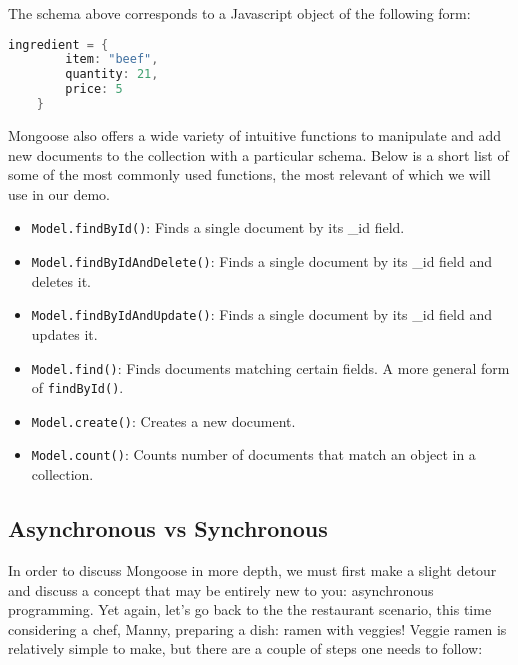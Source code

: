 The schema above corresponds to a Javascript object of the following form:

\begin{lstlisting}[language=Java]
    ingredient = {
        item: "beef",
        quantity: 21,
        price: 5
    }
\end{lstlisting}

Mongoose also offers a wide variety of intuitive functions to manipulate and add new documents to the collection with a particular schema. Below is a short list of some of the most commonly used functions, the most relevant of which we will use in our demo.

\begin{itemize}
    \item \texttt{Model.findById()}: Finds a single document by its \_id field.
    \item \texttt{Model.findByIdAndDelete()}: Finds a single document by its \_id field and deletes it.
    \item \texttt{Model.findByIdAndUpdate()}: Finds a single document by its \_id field and updates it.
    \item \texttt{Model.find()}: Finds documents matching certain fields. A more general form of \texttt{findById()}.
    \item \texttt{Model.create()}: Creates a new document.
    \item \texttt{Model.count()}: Counts number of documents that match an object in a collection.
\end{itemize}

\subsection*{Asynchronous vs Synchronous}

In order to discuss Mongoose in more depth, we must first make a slight detour and discuss a concept that may be entirely new to you: asynchronous programming. Yet again, let's go back to the the restaurant scenario, this time considering a chef, Manny, preparing a dish: ramen with veggies! Veggie ramen is relatively simple to make, but there are a couple of steps one needs to follow:


